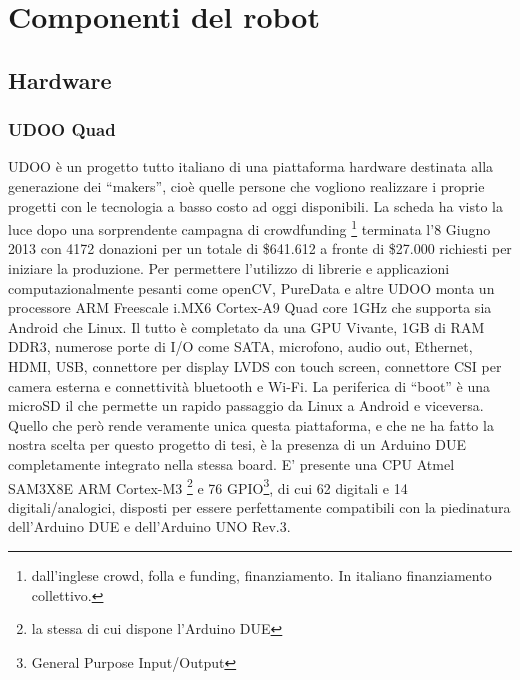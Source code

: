 \chapter{Componenti del robot}
\fancyfoot[C]{\thepage } 
\section{Hardware}
\subsection{UDOO Quad}
UDOO è un progetto tutto italiano di una piattaforma hardware destinata alla 
generazione dei ``makers'', cioè quelle persone che vogliono realizzare i 
proprie progetti con le tecnologia a basso costo ad oggi disponibili. La 
scheda ha visto la luce dopo una sorprendente campagna di crowdfunding
\footnote{dall'inglese crowd, folla e funding, finanziamento. In italiano finanziamento collettivo.} terminata l'8 Giugno 2013 con 4172 donazioni per un totale di \$641.612 a fronte di \$27.000 richiesti per iniziare la produzione. Per permettere l'utilizzo di librerie e applicazioni computazionalmente pesanti 
come openCV, PureData e altre UDOO monta un processore ARM Freescale i.MX6 
Cortex-A9 Quad core 1GHz che supporta sia Android che Linux. Il tutto è 
completato da una GPU Vivante, 1GB di RAM DDR3, numerose porte di I/O come 
SATA, microfono, audio out, Ethernet, HDMI, USB, connettore per display LVDS 
con touch screen, connettore CSI per camera esterna e connettività bluetooth e 
Wi-Fi. La periferica di ``boot'' è una microSD il che permette un rapido 
passaggio da Linux a Android e viceversa. Quello che però rende veramente 
unica questa piattaforma, e che ne ha fatto la nostra scelta per questo 
progetto di tesi, è la presenza di un Arduino DUE completamente integrato 
nella stessa board. 
E' presente una CPU Atmel SAM3X8E ARM Cortex-M3 \footnote{la stessa di cui 
dispone l'Arduino DUE} e 76 GPIO\footnote{General Purpose Input/Output}, di 
cui 62 digitali e 14 digitali/analogici, disposti per essere perfettamente 
compatibili con la piedinatura dell'Arduino DUE e dell'Arduino UNO Rev.3.


